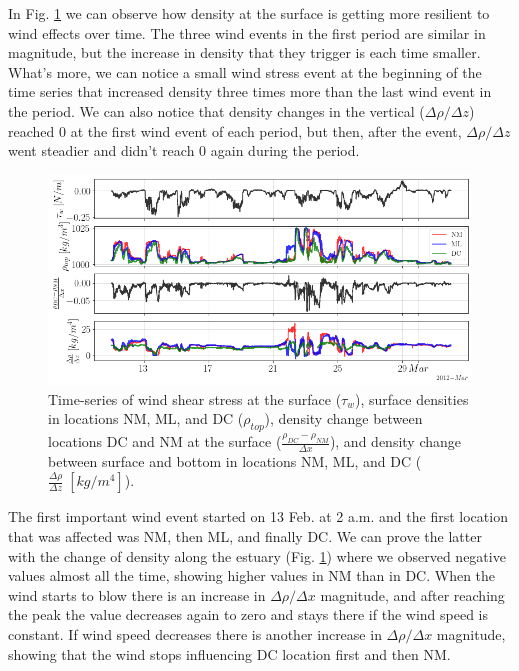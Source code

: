 \documentclass[tesis.tex]{subfiles}
\begin{document}
In Fig. \ref{fig:diff} we can observe how density at the surface is getting more resilient to wind effects over time. The three wind events in the first period are similar in magnitude, but the increase in density that they trigger is each time smaller. What's more, we can notice a small wind stress event at the beginning of the time series that increased density three times more than the last wind event in the period. We can also notice that density changes in the vertical ($\Delta \rho/\Delta z$) reached 0 at the first wind event of each period, but then, after the event, $\Delta \rho/\Delta z$ went steadier and didn't reach 0 again during the period.\\

\begin{figure}[h!]
    \centering
    \includegraphics[width=\textwidth]{Imagenes/diff.png}
    \caption{Time-series of wind shear stress at the surface ($\tau_w$), surface densities in locations NM, ML, and DC ($\rho_{top}$), density change between locations DC and NM at the surface ($\frac{\rho_{DC}-\rho_{NM}}{\Delta x}$), and density change between surface and bottom in locations NM, ML, and DC ($\frac{\Delta \rho}{\Delta z} \; [kg/m^4]$).}
    \label{fig:diff}
\end{figure}

The first important wind event started on 13 Feb. at 2 a.m. and the first location that was affected was NM, then ML, and finally DC. We can prove the latter with the change of density along the estuary (Fig. \ref{fig:diff}) where we observed negative values almost all the time, showing higher values in NM than in DC. When the wind starts to blow there is an increase in $\Delta \rho/\Delta x$ magnitude, and after reaching the peak the value decreases again to zero and stays there if the wind speed is constant. If wind speed decreases there is another increase in $\Delta \rho/\Delta x$ magnitude, showing that the wind stops influencing DC location first and then NM.\\
\end{document}
